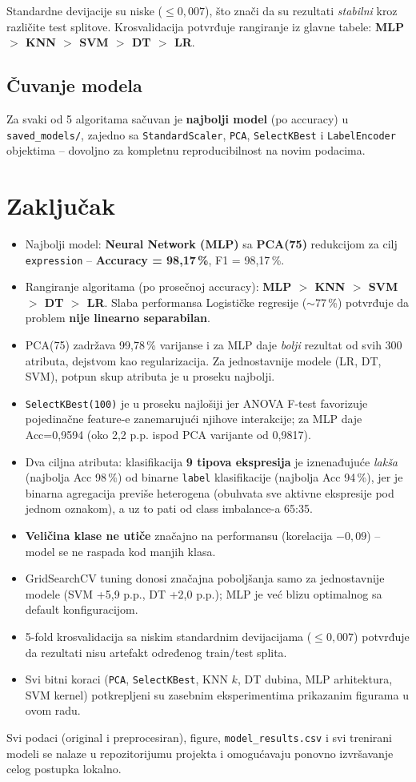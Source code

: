 \documentclass[12pt,a4paper]{article}
\begin{document}
Standardne devijacije su niske ($\leq 0{,}007$), što znači da su rezultati \emph{stabilni} kroz različite test splitove. Krosvalidacija potvrđuje rangiranje iz glavne tabele: \textbf{MLP $>$ KNN $>$ SVM $>$ DT $>$ LR}.

\subsection{Čuvanje modela}

Za svaki od 5 algoritama sačuvan je \textbf{najbolji model} (po accuracy) u \texttt{saved\_models/}, zajedno sa \texttt{StandardScaler}, \texttt{PCA}, \texttt{SelectKBest} i \texttt{LabelEncoder} objektima -- dovoljno za kompletnu reproducibilnost na novim podacima.

\section{Zaključak}

\begin{itemize}
    \item Najbolji model: \textbf{Neural Network (MLP)} sa \textbf{PCA(75)} redukcijom za cilj \texttt{expression} -- \textbf{Accuracy = 98{,}17\,\%}, F1 = 98{,}17\,\%.
    \item Rangiranje algoritama (po prosečnoj accuracy): \textbf{MLP $>$ KNN $>$ SVM $>$ DT $>$ LR}. Slaba performansa Logističke regresije ($\sim$77\,\%) potvrđuje da problem \textbf{nije linearno separabilan}.
    \item PCA(75) zadržava 99{,}78\,\% varijanse i za MLP daje \emph{bolji} rezultat od svih 300 atributa, dejstvom kao regularizacija. Za jednostavnije modele (LR, DT, SVM), potpun skup atributa je u proseku najbolji.
    \item \texttt{SelectKBest(100)} je u proseku najlošiji jer ANOVA F-test favorizuje pojedinačne feature-e zanemarujući njihove interakcije; za MLP daje Acc=0{,}9594 (oko 2{,}2 p.p. ispod PCA varijante od 0{,}9817).
    \item Dva ciljna atributa: klasifikacija \textbf{9 tipova ekspresija} je iznenađujuće \emph{lakša} (najbolja Acc 98\,\%) od binarne \texttt{label} klasifikacije (najbolja Acc 94\,\%), jer je binarna agregacija previše heterogena (obuhvata sve aktivne ekspresije pod jednom oznakom), a uz to pati od class imbalance-a 65:35.
    \item \textbf{Veličina klase ne utiče} značajno na performansu (korelacija $-0{,}09$) -- model se ne raspada kod manjih klasa.
    \item GridSearchCV tuning donosi značajna poboljšanja samo za jednostavnije modele (SVM +5{,}9 p.p., DT +2{,}0 p.p.); MLP je već blizu optimalnog sa default konfiguracijom.
    \item 5-fold krosvalidacija sa niskim standardnim devijacijama ($\leq 0{,}007$) potvrđuje da rezultati nisu artefakt određenog train/test splita.
    \item Svi bitni koraci (\texttt{PCA}, \texttt{SelectKBest}, KNN $k$, DT dubina, MLP arhitektura, SVM kernel) potkrepljeni su zasebnim eksperimentima prikazanim figurama u ovom radu.
\end{itemize}

\noindent Svi podaci (original i preprocesiran), figure, \texttt{model\_results.csv} i svi trenirani modeli se nalaze u repozitorijumu projekta i omogućavaju ponovno izvršavanje celog postupka lokalno.
\end{document}

